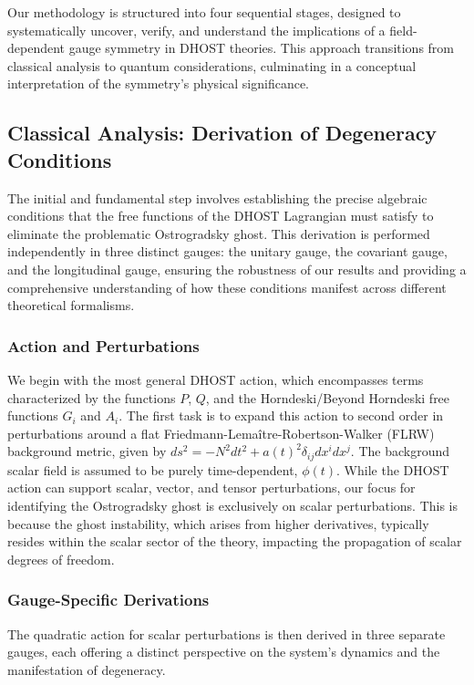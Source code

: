 \documentclass[twocolumn]{aastex631}
\begin{document}
Our methodology is structured into four sequential stages, designed to systematically uncover, verify, and understand the implications of a field-dependent gauge symmetry in DHOST theories. This approach transitions from classical analysis to quantum considerations, culminating in a conceptual interpretation of the symmetry's physical significance.

\subsection{Classical Analysis: Derivation of Degeneracy Conditions}

The initial and fundamental step involves establishing the precise algebraic conditions that the free functions of the DHOST Lagrangian must satisfy to eliminate the problematic Ostrogradsky ghost. This derivation is performed independently in three distinct gauges: the unitary gauge, the covariant gauge, and the longitudinal gauge, ensuring the robustness of our results and providing a comprehensive understanding of how these conditions manifest across different theoretical formalisms.

\subsubsection{Action and Perturbations}
We begin with the most general DHOST action, which encompasses terms characterized by the functions $P$, $Q$, and the Horndeski/Beyond Horndeski free functions $G_i$ and $A_i$. The first task is to expand this action to second order in perturbations around a flat Friedmann-Lemaître-Robertson-Walker (FLRW) background metric, given by $ds^2 = -N^2 dt^2 + a(t)^2 \delta_{ij} dx^i dx^j$. The background scalar field is assumed to be purely time-dependent, $\phi(t)$. While the DHOST action can support scalar, vector, and tensor perturbations, our focus for identifying the Ostrogradsky ghost is exclusively on scalar perturbations. This is because the ghost instability, which arises from higher derivatives, typically resides within the scalar sector of the theory, impacting the propagation of scalar degrees of freedom.

\subsubsection{Gauge-Specific Derivations}
The quadratic action for scalar perturbations is then derived in three separate gauges, each offering a distinct perspective on the system's dynamics and the manifestation of degeneracy.
\end{document}
